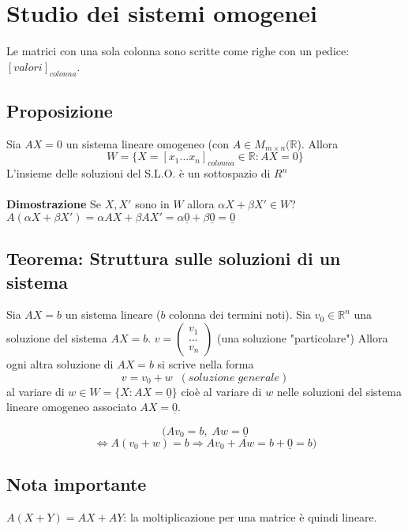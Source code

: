\section{Studio dei sistemi omogenei}
Le matrici con una sola colonna sono scritte come righe con un pedice: $[valori]_{colonna}$. 

\subsection{Proposizione}
Sia $AX=0$ un sistema lineare omogeneo (con $A\in M_{m\times n}(\mathbb{R}$). Allora 
\[W=\{X=[x_1...x_n]_{colonna} \in\mathbb{R}:AX=0\}\]
L'insieme delle soluzioni del S.L.O. è un sottospazio di $R^n$
\\
\\\textbf{Dimostrazione}
Se $X, X'$ sono in $W$ allora $\alpha X+\beta X'\in W$?
$A(\alpha X+\beta X')=\alpha AX+\beta AX'=\alpha \underline{0}+\beta \underline{0}=\underline{0}$
\subsection{Teorema: Struttura sulle soluzioni di un sistema}
Sia $AX=b$ un sistema lineare ($b$ colonna dei termini noti). 
Sia $v_0\in\mathbb{R}^n$ una soluzione del sistema $AX=b$.
$v=\begin{pmatrix}v_1\\...\\v_n\end{pmatrix}$ (una soluzione "particolare")
Allora ogni altra soluzione di $AX=b$ si scrive nella forma 
\[v=v_0+w\;\;(soluzione\;generale)\]
al variare di $w\in W=\{X:AX=\underline{0}\}$ cioè al variare di $w$ nelle soluzioni del sistema lineare omogeneo associato $AX=\underline{0}$.

\[(Av_0=b,\;Aw=\underline{0}\]
\[\Leftrightarrow A(v_0+w)=b\Rightarrow Av_0+Aw=b+\underline{0}=b)\]

\subsection{Nota importante}
$A(X+Y)=AX+AY$: la moltiplicazione per una matrice è quindi lineare.